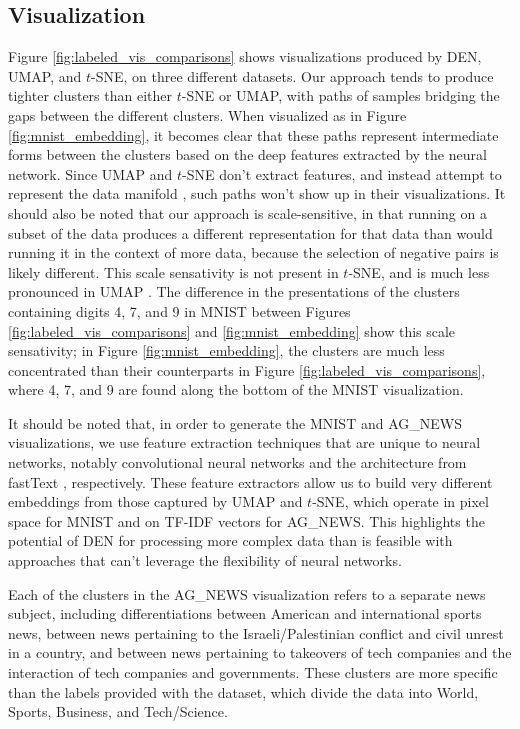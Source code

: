 \documentclass{article}
\begin{document}
\subsection{Visualization}



Figure \ref{fig:labeled_vis_comparisons} shows visualizations produced by DEN, UMAP, and $t$-SNE, on three different datasets. Our approach tends to produce tighter clusters than either $t$-SNE or UMAP, with paths of samples bridging the gaps between the different clusters. When visualized as in Figure \ref{fig:mnist_embedding}, it becomes clear that these paths represent intermediate forms between the clusters based on the deep features extracted by the neural network. Since UMAP and $t$-SNE don't extract features, and instead attempt to represent the data manifold \cite{maaten2008visualizing, 2018arXivUMAP}, such paths won't show up in their visualizations. It should also be noted that our approach is scale-sensitive, in that running on a subset of the data produces a different representation for that data than would running it in the context of more data, because the selection of negative pairs is likely different. This scale sensativity is not present in $t$-SNE, and is much less pronounced in UMAP \cite{maaten2008visualizing, 2018arXivUMAP}. The difference in the presentations of the clusters containing digits 4, 7, and 9 in MNIST between Figures \ref{fig:labeled_vis_comparisons} and \ref{fig:mnist_embedding} show this scale sensativity; in Figure \ref{fig:mnist_embedding}, the clusters are much less concentrated than their counterparts in Figure \ref{fig:labeled_vis_comparisons}, where 4, 7, and 9 are found along the bottom of the MNIST visualization.

It should be noted that, in order to generate the MNIST and AG\_NEWS visualizations, we use feature extraction techniques that are unique to neural networks, notably convolutional neural networks and the architecture from fastText \cite{joulin2016bag}, respectively. These feature extractors allow us to build very different embeddings from those captured by UMAP and $t$-SNE, which operate in pixel space for MNIST and on TF-IDF vectors for AG\_NEWS. This highlights the potential of DEN for processing more complex data than is feasible with approaches that can't leverage the flexibility of neural networks. 

Each of the clusters in the AG\_NEWS visualization refers to a separate news subject, including differentiations between American and international sports news, between news pertaining to the Israeli/Palestinian conflict and civil unrest in a country, and between news pertaining to takeovers of tech companies and the interaction of tech companies and governments. These clusters are more specific than the labels provided with the dataset, which divide the data into World, Sports, Business, and Tech/Science.
\end{document}
